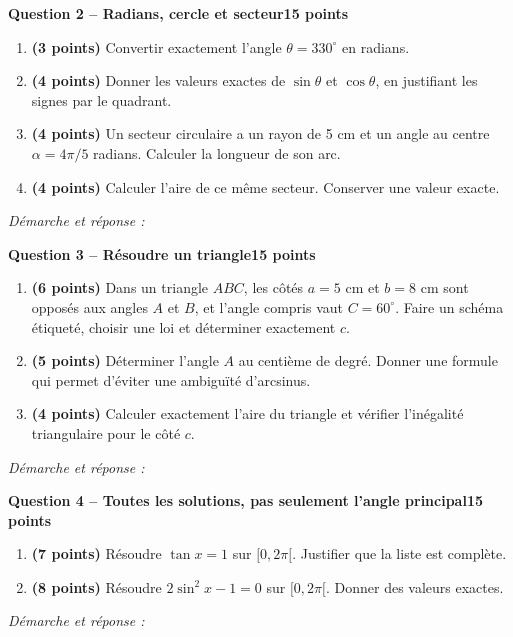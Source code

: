 \documentclass[11pt,a4paper]{article}
\begin{document}
\newpage
{\large\bfseries Question 2 -- Radians, cercle et secteur}\hfill\textbf{15 points}\par
\begin{enumerate}
\item \textbf{(3 points)} Convertir exactement l’angle \(\theta=330^\circ\) en radians.
\item \textbf{(4 points)} Donner les valeurs exactes de \(\sin\theta\) et \(\cos\theta\), en justifiant les signes par le quadrant.
\item \textbf{(4 points)} Un secteur circulaire a un rayon de 5 cm et un angle au centre \(\alpha=4\pi/5\) radians. Calculer la longueur de son arc.
\item \textbf{(4 points)} Calculer l’aire de ce même secteur. Conserver une valeur exacte.
\end{enumerate}
\vspace{3mm}\textit{Démarche et réponse :}\par\vfill

\newpage
{\large\bfseries Question 3 -- Résoudre un triangle}\hfill\textbf{15 points}\par
\begin{enumerate}
\item \textbf{(6 points)} Dans un triangle \(ABC\), les côtés \(a=5\) cm et \(b=8\) cm sont opposés aux angles \(A\) et \(B\), et l’angle compris vaut \(C=60^\circ\). Faire un schéma étiqueté, choisir une loi et déterminer exactement \(c\).
\item \textbf{(5 points)} Déterminer l’angle \(A\) au centième de degré. Donner une formule qui permet d’éviter une ambiguïté d’arcsinus.
\item \textbf{(4 points)} Calculer exactement l’aire du triangle et vérifier l’inégalité triangulaire pour le côté \(c\).
\end{enumerate}
\vspace{3mm}\textit{Démarche et réponse :}\par\vfill

\newpage
{\large\bfseries Question 4 -- Toutes les solutions, pas seulement l’angle principal}\hfill\textbf{15 points}\par
\begin{enumerate}
\item \textbf{(7 points)} Résoudre \(\tan x=1\) sur \([0,2\pi[\). Justifier que la liste est complète.
\item \textbf{(8 points)} Résoudre \(2\sin^2x-1=0\) sur \([0,2\pi[\). Donner des valeurs exactes.
\end{enumerate}
\vspace{3mm}\textit{Démarche et réponse :}\par\vfill
\end{document}
